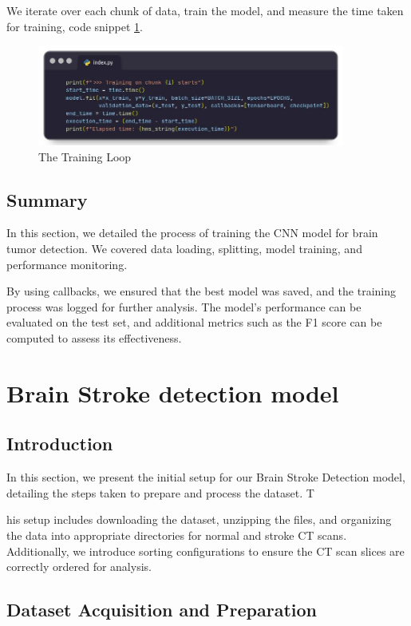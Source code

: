 We iterate over each chunk of data, train the model, and measure the time taken for training, code snippet \ref{fig:brain_tumor_training_loop}.

\begin{figure}
 \centering
    \includegraphics[width=0.90\textwidth]{Img/Chap-01/26.jpg}
    \caption{The Training Loop}
    \label{fig:brain_tumor_training_loop}
\end{figure}

\subsection{Summary}

In this section, we detailed the process of training the CNN model for brain tumor detection. We covered data loading, splitting, model training, and performance monitoring. 

By using callbacks, we ensured that the best model was saved, and the training process was logged for further analysis. The model's performance can be evaluated on the test set, and additional metrics such as the F1 score can be computed to assess its effectiveness.

\section{Brain Stroke detection model}
\subsection{Introduction}

In this section, we present the initial setup for our Brain Stroke Detection model, detailing the steps taken to prepare and process the dataset. T

his setup includes downloading the dataset, unzipping the files, and organizing the data into appropriate directories for normal and stroke CT scans. Additionally, we introduce sorting configurations to ensure the CT scan slices are correctly ordered for analysis. 

\subsection{Dataset Acquisition and Preparation}

